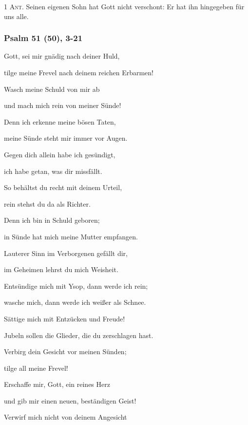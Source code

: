 \noindent \textsc{1 Ant.} Seinen eigenen Sohn hat Gott nicht verschont: Er hat ihn hingegeben für uns alle.

\subsubsection{Psalm 51 (50), 3-21}

\noindent Gott, sei mir gnädig nach deiner Huld,~\GreStar{}~\nopagebreak

tilge meine Frevel nach deinem reichen Erbarmen!

\noindent Wasch meine Schuld von mir ab~\GreStar{}~\nopagebreak

und mach mich rein von meiner Sünde!

\noindent Denn ich erkenne meine bösen Taten,~\GreStar{}~\nopagebreak

meine Sünde steht mir immer vor Augen.

\noindent Gegen dich allein habe ich gesündigt,~\GreStar{}~\nopagebreak

ich habe getan, was dir missfällt. 

\noindent So behältst du recht mit deinem Urteil,~\GreStar{}~\nopagebreak

rein stehst du da als Richter.

\noindent Denn ich bin in Schuld geboren;~\GreStar{}~\nopagebreak

in Sünde hat mich meine Mutter empfangen.

\noindent Lauterer Sinn im Verborgenen gefällt dir,~\GreStar{}~\nopagebreak

im Geheimen lehrst du mich Weisheit.

\noindent Entsündige mich mit Ysop, dann werde ich rein;~\GreStar{}~\nopagebreak

wasche mich, dann werde ich weißer als Schnee.

\noindent Sättige mich mit Entzücken und Freude!~\GreStar{}~\nopagebreak

Jubeln sollen die Glieder, die du zerschlagen hast.

\noindent Verbirg dein Gesicht vor meinen Sünden;~\GreStar{}~\nopagebreak

tilge all meine Frevel!

\noindent Erschaffe mir, Gott, ein reines Herz~\GreStar{}~\nopagebreak

und gib mir einen neuen, beständigen Geist!

\noindent Verwirf mich nicht von deinem Angesicht~\GreStar{}~\nopagebreak

